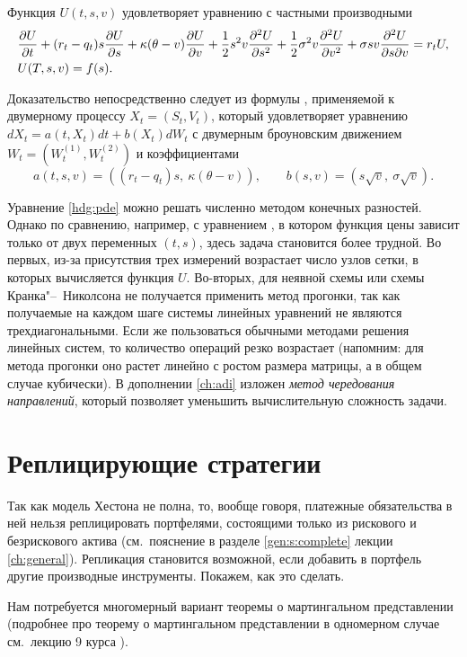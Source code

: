 \begin{proposition}
Функция $U(t,s,v)$ удовлетворяет уравнению с частными производными
\begin{align}
\label{hdg:pde}
&\frac{\partial U}{\partial t} + (r_t-q_t)s\frac{\partial U}{\partial s} + \kappa(\theta-v)\frac{\partial U}{\partial v} + \frac 12 s^2v \frac{\partial^2 U}{\partial s^2} + \frac12 \sigma^2v \frac{\partial^2 U}{\partial v^2} + \sigma sv \frac{\partial^2 U}{\partial s \partial v} = r_t U,\\
\label{hgd:pde-boundary}
&U(T,s,v) = f(s).
\end{align}
\end{proposition}

Доказательство непосредственно следует из формулы \fc, применяемой к двумерному процессу $X_t=(S_t,V_t)$, который удовлетворяет уравнению $dX_t = a(t, X_t)dt + b(X_t) dW_t$ с двумерным броуновским движением $W_t = (W_t^{(1)}, W_t^{(2)})$ и коэффициентами
\[
a(t,s,v) = ((r_t-q_t)s,\ \kappa(\theta-v)), \qquad b(s,v) = (s\sqrt{v},\ \sigma\sqrt{v}).
\]

Уравнение \eqref{hdg:pde} можно решать численно методом конечных разностей.
Однако по сравнению, например, с уравнением \bs, в котором функция цены зависит только от двух переменных $(t,s)$, здесь задача становится более трудной.
Во первых, из-за присутствия трех измерений возрастает число узлов сетки, в которых вычисляется функция $U$.
Во-вторых, для неявной схемы или схемы Кранка"--~Николсона не получается применить метод прогонки, так как получаемые на каждом шаге системы линейных уравнений не являются трехдиагональными.
Если же пользоваться обычными методами решения линейных систем, то количество операций резко возрастает (напомним: для метода прогонки оно растет линейно с ростом размера матрицы, а в общем случае кубически).
В дополнении \ref{ch:adi} изложен \emph{метод чередования направлений}, который позволяет уменьшить вычислительную сложность задачи.


\section{Реплицирующие стратегии}
Так как модель Хестона не полна, то, вообще говоря, платежные обязательства в ней нельзя реплицировать портфелями, состоящими только из рискового и безрискового актива (см.~пояснение в разделе \ref{gen:s:complete} лекции \ref{ch:general}).
Репликация становится возможной, если добавить в портфель другие производные инструменты.
Покажем, как это сделать.

Нам потребуется многомерный вариант теоремы о мартингальном представлении (подробнее про теорему о мартингальном представлении в одномерном случае см.~лекцию 9 курса \intro).

